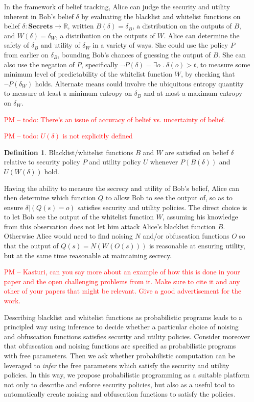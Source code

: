\documentclass{article} %
\newcommand{\pxm}[1]{\textcolor{red}{PM -- #1}}
\newcommand{\ra}{\rightarrow}
\newcommand{\Real}{\mathbb{R}}
\newcommand{\secrets}[0]{\textbf{Secrets}}
\newcommand{\paren}[1]{\left( #1 \right)}
\newcommand{\cond}[0]{|}
\newcommand{\qsep}[0]{\; . \;}
\theoremstyle{plain} %
\theoremstyle{definition} %
\newtheorem*{definition-un}{Definition}
\begin{document}
In the framework of belief tracking, Alice can judge the security and
utility inherent in Bob's belief $ \delta $ by evaluating the
blacklist and whitelist functions on belief $ \delta : \secrets \ra
\Real $, written $ B(\delta) = \delta_B $, a distribution on the
outputs of $ B $, and $ W(\delta) = \delta_W$, a distribution on the
outputs of $ W $. Alice can determine the safety of $ \delta_B $ and utility of $
\delta_W $ in a variety of ways. She could use the policy $ P $ from
earlier on $ \delta_B $, bounding Bob's chances of guessing the output
of $ B $. She can also use the negation of $ P $, specifically $ \neg
P(\delta) = \exists o \qsep \delta(o) > t $, to measure some minimum
level of predictability of the whitelist function $ W $, by checking
that $ \neg P(\delta_W) $ holds. Alternate means could involve the
ubiquitous entropy quantity to measure at least a minimum entropy on $
\delta_B $ and at most a maximum entropy on $ \delta_W $.

\pxm{todo: There's an issue of accuracy of belief vs. uncertainty of belief. }

\pxm{todo: $ U(\delta) $ is not explicitly defined}

\begin{definition-un} Blacklist/whitelist functions $ B $ and $ W $
  are satisfied on belief $ \delta $ relative to security policy $ P $
  and utility policy $  U $ whenever $P(B(\delta))$ and $U(W(\delta))$ hold.
\end{definition-un}

Having the ability to measure the secrecy and utility of Bob's belief,
Alice can then determine which function $ Q $ to allow Bob to see the
output of, so as to ensure $ \delta \cond \paren{Q(s) = o} $ satisfies
security and utility policies. The direct choice is to let Bob see the
output of the whitelist function $ W $, assuming his knowledge from
this observation does not let him attack Alice's blacklist function $
B $. Otherwise Alice would need to find noising $ N $ and/or
obfuscation functions $ O $ so that the output of $ Q(s) = N(W(O(s)))
$ is reasonable at ensuring utility, but at the same time reasonable
at maintaining secrecy.

\pxm{Kasturi, can you say more about an example of how this is done in
  your paper and the open challenging problems from it. Make sure to
  cite it \cite{chakraborty12balancing} and any other of your papers
  that might be relevant. Give a good advertisement for the work.}
  
Describing blacklist and whitelist functions as probabilistic programs
leads to a principled way using inference to decide whether a particular
choice of noising and obfuscation functions satisfies security and utility policies.
Consider moreover that obfuscation and noising functions are specified as probabilistic programs
with free parameters. Then we ask whether
probabilistic computation can be leveraged to \emph{infer} the free parameters
 which satisfy the security and utility policies. In this way, we propose probabilistic
 programming as a suitable platform not only to describe and enforce security policies, but
also as a useful tool to automatically create noising and obfuscation functions to satisfy the policies.
\end{document}
